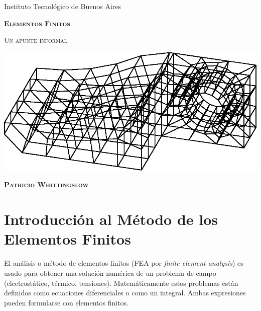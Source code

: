 \documentclass[11pt, a4paper,titlepage]{article}
\begin{document}
	\pagestyle{empty}
\begin{titlepage} %
	
\centering
{Instituto Tecnológico de Buenos Aires \par}
\vspace{2cm}

{\scshape \Huge \bf Elementos Finitos\par}

\vspace{.8cm}

{\scshape\Large Un apunte informal\par}
\vfill
\vspace{3cm}

{
	\centering
	\includegraphics[width=\textwidth]{fig/sear.eps}
	
}
\vfill

{\scshape\Large\textbf{Patricio Whittingslow} \par}
\vspace{4cm}
\medskip %

\end{titlepage} %
\tableofcontents
\clearpage

\pagestyle{plain}
\setcounter{page}{1}
\setcounter{section}{-1}
\section{Introducción al Método de los Elementos Finitos}
El análisis o método de elementos finitos (FEA por \textit{finite element analysis}) es usado para obtener una solución numérica de un problema de campo (electrostático, térmico, tensiones). Matemáticamente estos problemas están definidos como ecuaciones diferenciales o como un integral. Ambas expresiones pueden formularse con elementos finitos.
\end{document}

